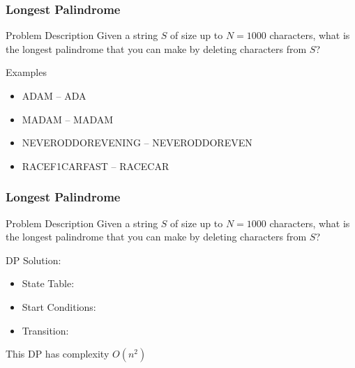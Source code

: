 \documentclass{beamer}
\begin{document}
\begin{frame}
  \frametitle{Longest Palindrome}
  {\smaller
    \begin{block}{Problem Description}
      Given a string $S$ of size up to $N = 1000$ characters, what is the
      longest palindrome that you can make by deleting characters from $S$?
    \end{block}

    Examples
    \begin{itemize}
    \item ADA\alert{M} -- ADA
    \item MADAM -- MADAM
    \item NEVERODDOREVEN\alert{ING} -- NEVERODDOREVEN
    \item RACE\alert{F1}CAR\alert{FAST} -- RACECAR
    \end{itemize}

  }
\end{frame}

\begin{frame}
  \frametitle{Longest Palindrome}
  {\smaller
    \begin{block}{Problem Description}
      Given a string $S$ of size up to $N = 1000$ characters, what is the
      longest palindrome that you can make by deleting characters from $S$?
    \end{block}

    DP Solution:
    \begin{itemize}
    \item State Table: 
    \item Start Conditions: 
    \item Transition: 
    \end{itemize}

    This DP has complexity $O(n^2)$

  }
\end{frame}
\end{document}
